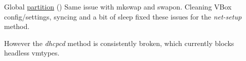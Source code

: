 
\begin{DoxyRefList}
\item[Global \mbox{\hyperlink{group__mk_file_system_gaa9952b2711fe0413d7a0bc6639c7f5a5}{partition}} ()]\label{bug__bug000001}%
%
Same issue with mkswap and swapon. Cleaning V\+Box config/settings, syncing and a bit of sleep fixed these issues for the {\itshape net-\/setup} method. 

However the {\itshape dhcpcd} method is consistently broken, which currently blocks headless vmtypes. 
\end{DoxyRefList}